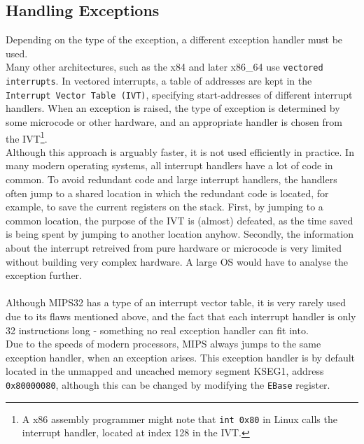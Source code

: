 \subsection{Handling Exceptions}
Depending on the type of the exception, a different exception handler must be
used.\\
Many other architectures, such as the x84 and later x86\_64 use \texttt{vectored
interrupts}. In vectored interrupts, a table of addresses are kept in the
\texttt{Interrupt Vector Table (IVT)}, specifying start-addresses of different
interrupt handlers. When an exception is raised, the type of exception is
determined by some microcode or other hardware, and an appropriate handler is
chosen from the IVT\footnote{A x86 assembly
programmer might note that \texttt{int 0x80} in Linux calls the interrupt handler,
located at index 128 in the IVT.}\cite{osdev:interrupt_vector_table}\cite{see_mips_run}. \\
Although this approach is arguably faster, it is not used efficiently in
practice. In many modern operating systems, all interrupt handlers have a lot
of code in common. To avoid redundant code and large interrupt handlers, the
handlers often jump to a shared location in which the redundant code is located,
for example, to save the current registers on the stack.
First, by jumping to a common location, the purpose of the IVT is (almost) defeated,
as the time saved is being spent by jumping to another location anyhow. Secondly, the
information about the interrupt retreived from pure hardware or microcode is
very limited without building very complex hardware. A large OS would have to
analyse the exception further.\\\\
Although MIPS32 has a type of an interrupt vector table, it is very rarely used due to its
flaws mentioned above, and the fact that each interrupt handler is only 32
instructions long - something no real exception handler can fit into\cite{see_mips_run}.\\
Due to the speeds of modern processors, MIPS always jumps to the same exception
handler, when an exception arises. This exception handler is by default located in the
unmapped and uncached memory segment KSEG1, address \texttt{0x80000080}, although
this can be changed by modifying the \texttt{EBase} register.

